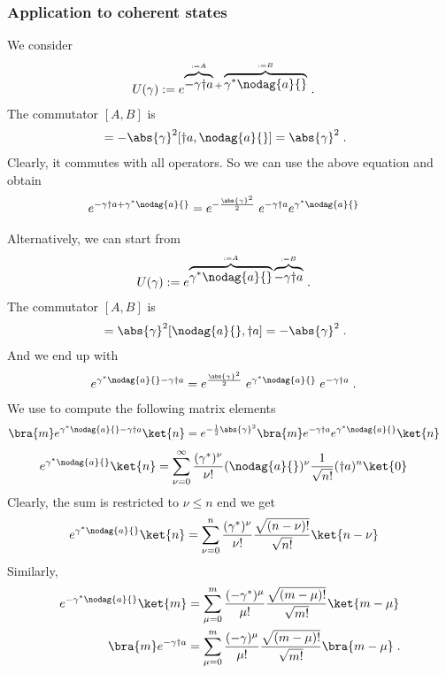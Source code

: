 \subsubsection{Application to coherent states}
We consider
%
\begin{align*}
U(\gamma)&:= e^{\overbrace{-\gamma\dag{a}{}}^{:=A}+\overbrace{\gamma^{*}\nodag{a}{}}^{:=B}} \;.
\end{align*}
The commutator $[A,B]$ is
%
\begin{align*}
[A,B] &= -\abs{\gamma}^{2} [\dag{a}{},\nodag{a}{}] =  \abs{\gamma}^{2}\;.
\end{align*}
%
Clearly, it commutes with all operators. So we can use the above equation
and obtain
%
\begin{align}\label{eq:coherent:1}
 e^{-\gamma\dag{a}{}+\gamma^{*}\nodag{a}{}} &= 
 e^{-\frac{\abs{\gamma}^{2}}{2}}\;
 e^{-\gamma \dag{a}{}} e^{\gamma^{*} \nodag{a}{}} 
\end{align}
%

Alternatively, we can start from
%
\begin{align*}
U(\gamma)&:= e^{\overbrace{\gamma^{*}\nodag{a}{}}^{:=A}\overbrace{-\gamma\dag{a}{}}^{:=B}} \;.
\end{align*}
The commutator $[A,B]$ is
%
\begin{align*}
[A,B] &= \abs{\gamma}^{2} [\nodag{a}{},\dag{a}{}] =  -\abs{\gamma}^{2}\;.
\end{align*}
%
And we end up with
%
\begin{align*}
 e^{\gamma^{*}\nodag{a}{}-\gamma\dag{a}{}} &= 
 e^{\frac{\abs{\gamma}^{2}}{2}}\;
e^{\gamma^{*} \nodag{a}{}} \; e^{-\gamma \dag{a}{}} \;.
\end{align*}
%
We use  to compute the following matrix elements
%
\begin{align*}
\bra{m} e^{\gamma^{*}\nodag{a}{}-\gamma\dag{a}{}} \ket{n} &=
e^{-\frac{1}{2}\abs{\gamma}^{2}} 
\bra{m} e^{-\gamma\dag{a}{}} 
e^{\gamma^{*}\nodag{a}{}}
\ket{n}
\end{align*}
%
%
\begin{align*}
e^{\gamma^{*}\nodag{a}{}} \ket{n} &= 
\sum_{\nu=0}^{\infty} \frac{(\gamma^{*})^{\nu}}{\nu!}
(\nodag{a}{})^{\nu} \frac{1}{\sqrt{n!}} (\dag{a}{})^{n}\ket{0}
\end{align*}
%
Clearly, the sum is restricted to $\nu\le n$ end we get
\begin{align*}
e^{\gamma^{*}\nodag{a}{}} \ket{n} &= 
\sum_{\nu=0}^{n} \frac{(\gamma^{*})^{\nu}}{\nu!}
\frac{\sqrt{(n-\nu)!}}{\sqrt{n!}} \ket{n-\nu}
\end{align*}
Similarly,
\begin{align*}
e^{-\gamma^{*}\nodag{a}{}} \ket{m} &= 
\sum_{\mu=0}^{m} \frac{(-\gamma^{*})^{\mu}}{\mu!}
\frac{\sqrt{(m-\mu)!}}{\sqrt{m!}} \ket{m-\mu}\\
\bra{m} e^{-\gamma\dag{a}{}}  &= 
\sum_{\mu=0}^{m} \frac{(-\gamma)^{\mu}}{\mu!}
\frac{\sqrt{(m-\mu)!}}{\sqrt{m!}} \bra{m-\mu}\;.
\end{align*}

